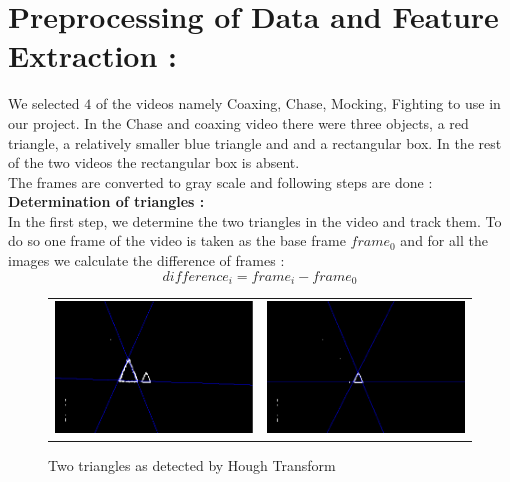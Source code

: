 \documentclass[11pt, twocolumn]{article}
\begin{document}
\section*{Preprocessing of Data and Feature Extraction : }
We selected $4$ of the videos namely Coaxing, Chase, Mocking, Fighting to use in our project. In the Chase and coaxing video there were three objects, a red triangle, a relatively smaller blue triangle and and a rectangular box. In the rest of the two videos the rectangular box is absent.\\
The frames are converted to gray scale and following steps are done :\\
{\bf Determination of triangles : }\\ \hspace*{10pt} In the first step, we determine the two triangles in the video and track them. To do so one frame of the video is taken as the base frame $frame_0$ and for all the images we calculate the difference of frames :
	$$difference_i = frame_i - frame_0$$
\begin{figure}[H]
\center
\begin{tabular}{cc}
\includegraphics[scale=0.25]{0002l.png} & 
\includegraphics[scale=0.25]{0002s.png}
\end{tabular}
\label{tab:gt}
\caption{Two triangles as detected by Hough Transform}
\end{figure}
\end{document}
